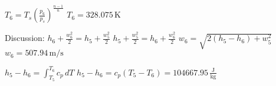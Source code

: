 \( T_6 = T_s \left( \frac{p_6}{p_s} \right)^{\frac{n-1}{n}} \)  
\( T_6 = 328.075 \, \text{K} \)  

Discussion:  
\( h_6 + \frac{w_6^2}{2} = h_5 + \frac{w_5^2}{2} \)  
\( h_5 + \frac{w_5^2}{2} = h_6 + \frac{w_6^2}{2} \)  
\( w_6 = \sqrt{2(h_5 - h_6) + w_5^2} \)  
\( w_6 = 507.94 \, \text{m/s} \)  

\( h_5 - h_6 = \int_{T_5}^{T_6} c_p \, dT \)  
\( h_5 - h_6 = c_p (T_5 - T_6) = 104667.95 \, \frac{\text{J}}{\text{kg}} \)